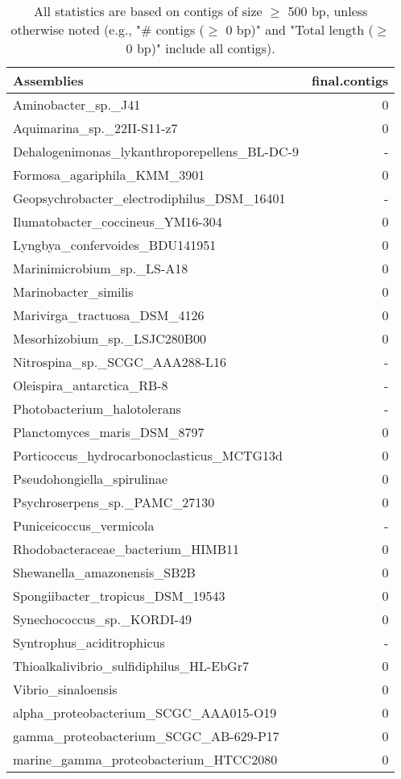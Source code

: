 \documentclass[12pt,a4paper]{article}
\begin{document}
\begin{table}[ht]
\begin{center}
\caption{All statistics are based on contigs of size $\geq$ 500 bp, unless otherwise noted (e.g., "\# contigs ($\geq$ 0 bp)" and "Total length ($\geq$ 0 bp)" include all contigs).}
\begin{tabular}{|l*{1}{|r}|}
\hline
Assemblies & final.contigs \\ \hline
Aminobacter\_sp.\_J41 & 0 \\ \hline
Aquimarina\_sp.\_22II-S11-z7 & 0 \\ \hline
Dehalogenimonas\_lykanthroporepellens\_BL-DC-9 & - \\ \hline
Formosa\_agariphila\_KMM\_3901 & 0 \\ \hline
Geopsychrobacter\_electrodiphilus\_DSM\_16401 & - \\ \hline
Ilumatobacter\_coccineus\_YM16-304 & 0 \\ \hline
Lyngbya\_confervoides\_BDU141951 & 0 \\ \hline
Marinimicrobium\_sp.\_LS-A18 & 0 \\ \hline
Marinobacter\_similis & 0 \\ \hline
Marivirga\_tractuosa\_DSM\_4126 & 0 \\ \hline
Mesorhizobium\_sp.\_LSJC280B00 & 0 \\ \hline
Nitrospina\_sp.\_SCGC\_AAA288-L16 & - \\ \hline
Oleispira\_antarctica\_RB-8 & - \\ \hline
Photobacterium\_halotolerans & - \\ \hline
Planctomyces\_maris\_DSM\_8797 & 0 \\ \hline
Porticoccus\_hydrocarbonoclasticus\_MCTG13d & 0 \\ \hline
Pseudohongiella\_spirulinae & 0 \\ \hline
Psychroserpens\_sp.\_PAMC\_27130 & 0 \\ \hline
Puniceicoccus\_vermicola & - \\ \hline
Rhodobacteraceae\_bacterium\_HIMB11 & 0 \\ \hline
Shewanella\_amazonensis\_SB2B & 0 \\ \hline
Spongiibacter\_tropicus\_DSM\_19543 & 0 \\ \hline
Synechococcus\_sp.\_KORDI-49 & 0 \\ \hline
Syntrophus\_aciditrophicus & - \\ \hline
Thioalkalivibrio\_sulfidiphilus\_HL-EbGr7 & 0 \\ \hline
Vibrio\_sinaloensis & 0 \\ \hline
alpha\_proteobacterium\_SCGC\_AAA015-O19 & 0 \\ \hline
gamma\_proteobacterium\_SCGC\_AB-629-P17 & 0 \\ \hline
marine\_gamma\_proteobacterium\_HTCC2080 & 0 \\ \hline
\end{tabular}
\end{center}
\end{table}
\end{document}
